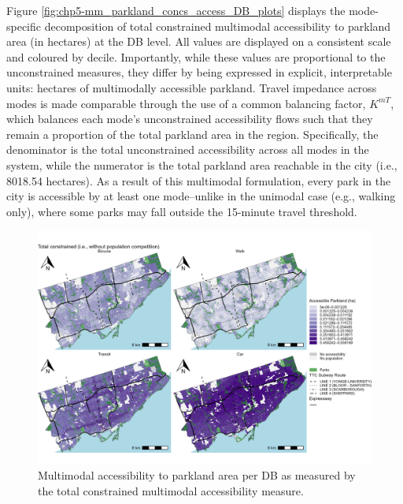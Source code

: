 \documentclass[
11pt, %
oneside, %
english, %
singlespacing, %
]{macthesis} %
\begin{document}
Figure \ref{fig:chp5-mm_parkland_concs_access_DB_plots} displays the mode-specific decomposition of total constrained multimodal accessibility to parkland area (in hectares) at the DB level. All values are displayed on a consistent scale and coloured by decile. Importantly, while these values are proportional to the unconstrained measures, they differ by being expressed in explicit, interpretable units: hectares of multimodally accessible parkland. Travel impedance across modes is made comparable through the use of a common balancing factor, \(K^{mT}\), which balances each mode's unconstrained accessibility flows such that they remain a proportion of the total parkland area in the region. Specifically, the denominator is the total unconstrained accessibility across all modes in the system, while the numerator is the total parkland area reachable in the city (i.e., 8018.54 hectares). As a result of this multimodal formulation, every park in the city is accessible by at least one mode--unlike in the unimodal case (e.g., walking only), where some parks may fall outside the 15-minute travel threshold.

\begin{figure}

{\centering \includegraphics[width=6in]{./data/figures/chp5-mm_parkland_total_conc_access_DB_plots} 

}

\caption{\label{fig:chp5-mm_parkland_concs_access_DB_plots}Multimodal accessibility to parkland area per DB as measured by the total constrained multimodal accessibility measure.}\label{fig:unnamed-chunk-76}
\end{figure}
\end{document}
